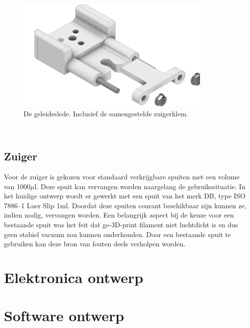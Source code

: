 \begin{minipage}[t]{0.59\textwidth}
    \vspace{0pt}
    \begin{figure}[H]
        \centering
        \includegraphics[width=0.85\textwidth]{figures/CarriageAndClamp.png}
        \caption{De geleideslede. Inclusief de samengestelde zuigerklem.}\label{fig:CarriageAndClamp}
    \end{figure}
\end{minipage}\\

\subsection{Zuiger}
Voor de zuiger is gekozen voor standaard verkrijgbare spuiten met een volume van 1000$\mu$l. Deze spuit kan vervangen worden naargelang de gebruikssituatie. In het huidige ontwerp wordt er gewerkt met een spuit van het merk DB, type ISO 7886--1 Luer Slip 1ml. Doordat deze spuiten courant beschikbaar zijn kunnen ze, indien nodig, vervangen worden.
Een belangrijk aspect bij de keuze voor een bestaande spuit was het feit dat ge-3D-print filament niet luchtdicht is en dus geen stabiel vacuum zou kunnen onderhouden. Door een bestaande spuit te gebruiken kan deze bron van fouten deels verholpen worden.

\section{Elektronica ontwerp}


\section{Software ontwerp}

